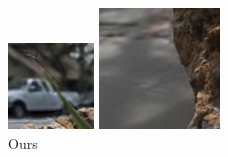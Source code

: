 \documentclass[10pt,twocolumn,letterpaper]{article}
\begin{document}
\begin{figure}[h]
\begin{multicols}{2}
\begin{multicols}{3}
            \includegraphics[width=\linewidth]{rock_crop_leaf/ours_05_05.png}\par\vspace{0.1in}\includegraphics[width=\linewidth]{rock_crop_walk/ours_05_05.png}\par\caption*{Ours}

\end{multicols}
\end{multicols}
\end{figure}
\end{document}
